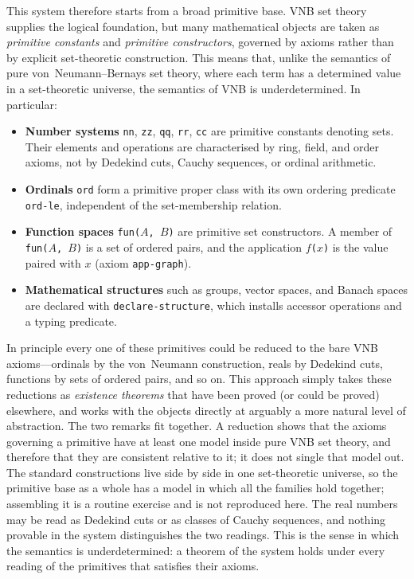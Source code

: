 This system therefore starts from a broad primitive base.  VNB set
theory supplies the logical foundation, but many mathematical objects
are taken as \emph{primitive constants} and \emph{primitive
constructors}, governed by axioms rather than by explicit
set-theoretic construction.  This means that, unlike the semantics of
pure von~Neumann--Bernays set theory, where each term has a determined
value in a set-theoretic universe, the semantics of VNB is
underdetermined.  In particular:

\begin{itemize}
\item \textbf{Number systems} \texttt{nn}, \texttt{zz}, \texttt{qq},
  \texttt{rr}, \texttt{cc} are primitive constants denoting sets.  Their
  elements and operations are characterised by ring, field, and order
  axioms, not by Dedekind cuts, Cauchy sequences, or ordinal arithmetic.
\item \textbf{Ordinals} \texttt{ord} form a primitive proper class with
  its own ordering predicate \texttt{ord-le}, independent of the
  set-membership relation.
\item \textbf{Function spaces} \texttt{fun($A$, $B$)} are primitive
  set constructors.  A member of \texttt{fun($A$, $B$)} is a set of
  ordered pairs, and the application \texttt{$f$($x$)} is the value
  paired with $x$ (axiom \texttt{app-graph}).
\item \textbf{Mathematical structures} such as groups, vector spaces,
  and Banach spaces are declared with \texttt{declare-structure}, which
  installs accessor operations and a typing predicate.
\end{itemize}

In principle every one of these primitives could be reduced to the bare
VNB axioms---ordinals by the von~Neumann construction, reals by Dedekind
cuts, functions by sets of ordered pairs, and so on.  This approach
simply takes these reductions as \emph{existence theorems} that
have been proved (or could be proved) elsewhere, and works with the
objects directly at arguably a more natural level of abstraction.
The two remarks fit together.  A reduction shows that the axioms
governing a primitive have at least one model inside pure VNB set
theory, and therefore that they are consistent relative to it; it does
not single that model out.  The standard constructions live side by
side in one set-theoretic universe, so the primitive base as a whole
has a model in which all the families hold together; assembling it is
a routine exercise and is not reproduced here.  The real numbers may be read as Dedekind
cuts or as classes of Cauchy sequences, and nothing provable in the
system distinguishes the two readings.  This is the sense in which the
semantics is underdetermined: a theorem of the system holds under every
reading of the primitives that satisfies their axioms.

